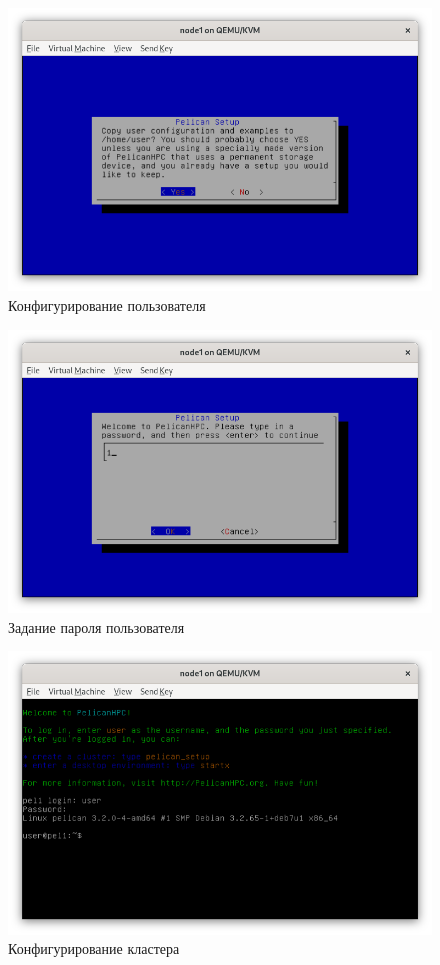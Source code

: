 \begin{figure}[H]
	\centering
	\includegraphics[width=0.7\linewidth]{1-06}
	\caption{Конфигурирование пользователя}
	\label{init/06}
\end{figure}

\begin{figure}[H]
	\centering
	\includegraphics[width=0.7\linewidth]{1-07}
	\caption{Задание пароля пользователя}
	\label{init/07}
\end{figure}

\begin{figure}[H]
	\centering
	\includegraphics[width=0.7\linewidth]{1-08}
	\caption{Конфигурирование кластера}
	\label{init/08}
\end{figure}

